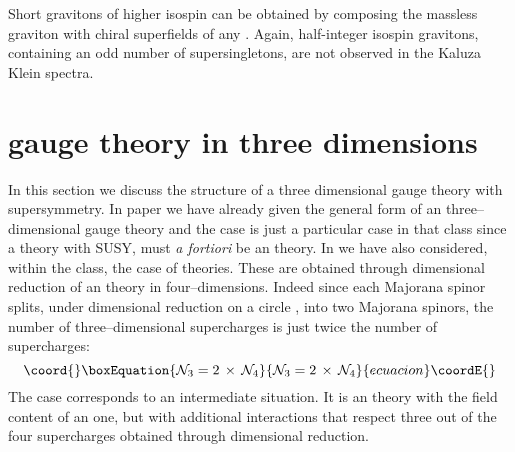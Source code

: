 \documentclass[a4paper,12pt]{article}
\begin{document}
Short gravitons of higher isospin can be obtained by composing
the \coordHE{} massless graviton with chiral superfields of any \coordHE{}.
Again, half-integer isospin gravitons, containing an odd number of
supersingletons, are not observed in the Kaluza Klein spectra.
\section{\coordHE{} gauge theory in three dimensions}\label{N=3gaugetheory}
In this section we discuss the structure of a three dimensional gauge
theory with \coordHE{} supersymmetry. In paper \cite{susp} we
have already given the general form of an \coordHE{}
three--dimensional gauge theory and the \coordHE{} case is just
a particular case in that class since a theory with \coordHE{}
SUSY, must {\it a fortiori} be an \coordHE{} theory.
In \cite{susp} we have also considered, within the \coordHE{}
class, the case of \coordHE{} theories. These are obtained
through dimensional reduction of an \coordHE{} theory in
four--dimensions.
Indeed since each \coordHE{} Majorana spinor splits, under dimensional
reduction on a circle \coordHE{}, into two \coordHE{} Majorana
spinors, the number of three--dimensional supercharges is just twice
the number of \coordHE{} supercharges:
\begin{equation}\coord{}\boxEquation{
  {\cal N}_3 = 2 \, \times \, {\cal N}_4
\label{n34}
}{
  {\cal N}_3 = 2 \, \times \, {\cal N}_4
}{ecuacion}\coordE{}\end{equation}
The \coordHE{} case corresponds to an intermediate situation.
It is an \coordHE{} theory with the field content of an
\coordHE{} one, but with additional \coordHE{} interactions
that respect  three out of the four supercharges obtained through
dimensional reduction.
\end{document}

